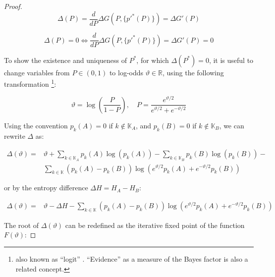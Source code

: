 \documentclass{article}
\theoremstyle{definition}
\begin{document}
\begin{proof}
\begin{equation}
    \Delta (P) = \frac{d}{d P} \Delta G(P,\{p'^*(P)\}) = \Delta G'(P)
\end{equation}

\begin{equation}
    \Delta (P) = 0 \iff \frac{d}{d P} \Delta G(P,\{p'^*(P)\}) = \Delta G'(P) = 0
\end{equation}

To show the existence and uniqueness of $P^*$, for which $\Delta(P^*) = 0$, it is useful to change variables from $P \in (0,1)$ to log-odds $\vartheta \in \mathbb{R}$, using the following transformation \footnote{also known as ``logit'' \cite{book:StatisticalLearning}. ``Evidence'' \cite{book:Jaynes} as a measure of the Bayes factor is also a related concept.}:

\begin{equation}
    \vartheta = \log \left ( \frac{P}{1-P} \right ), \quad P = \frac{e^{\vartheta/2}}{e^{\vartheta/2}+e^{-\vartheta/2}}
\end{equation}

Using the convention $p_k(A) = 0$ if $k \notin \mathbb{K}_A$, and $p_k(B) = 0$ if $k \notin \mathbb{K}_B$, we can rewrite $\Delta$ as:

\begin{equation}
    \begin{split}
    \Delta(\vartheta) = & \vartheta + \sum_{k \in \mathbb{K}_A} p_k(A) \log(p_k(A)) - 
                        \sum_{k \in \mathbb{K}_B} p_k(B) \log(p_k(B)) - \\
                        & \sum_{k \in \mathbb{K}} (p_k(A) - p_k(B))
                        \log \left ( e^{\vartheta/2} p_k(A) + e^{-\vartheta/2} p_k(B) \right )
    \end{split}
\end{equation}

or by the entropy difference $\Delta H = H_A-H_B$:

\begin{equation}
    \begin{split}
    \Delta(\vartheta) = & \vartheta - \Delta H - 
                         \sum_{k \in \mathbb{K}} (p_k(A) - p_k(B))
                        \log \left ( e^{\vartheta/2} p_k(A) + e^{-\vartheta/2} p_k(B) \right )
    \end{split}
\end{equation}

The root of $\Delta(\vartheta)$ can be redefined as the iterative fixed point of the function $F(\vartheta)$:


\end{proof}
\end{document}
